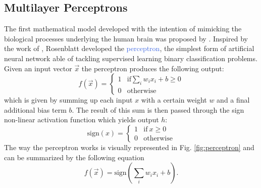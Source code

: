 \subsection{Multilayer Perceptrons}
\label{sec:general_architecture}
The first mathematical model developed with the intention of mimicking the biological processes underlying the human brain was proposed by \citet{rosenblatt1958perceptron}. Inspired by the work of \citet{mcculloch1943logical}, Rosenblatt developed the \textcolor{RoyalBlue}{perceptron}, the simplest form of artificial neural network able of tackling supervised learning binary classification problems. Given an input vector $\vec{x}$ the perceptron produces the following output:
\begin{equation}
	f(\vec{x}) = 
		\begin{cases}
			1  & \text{if} \sum_i w_i x_i + b \geq 0 \\
			0 & \text{otherwise}
		\end{cases}
\end{equation}
which is given by summing up each input $x$ with a certain weight $w$ and a final additional bias term $b$. The result of this sum is then passed through the sign non-linear activation function which yields output $h$:
\begin{equation}
	\text{sign}(x) = 
		\begin{cases}
			1  & \text{if} \: x \geq 0 \\
			0 & \text{otherwise}
		\end{cases}
\end{equation}
The way the perceptron works is visually represented in Fig. \ref{fig:perceptron} and can be summarized by the following equation
\begin{equation}
	f(\vec{x}) = \text{sign}(\sum_i w_i x_i + b).
	\label{eq:perceptron_equation}
\end{equation}

